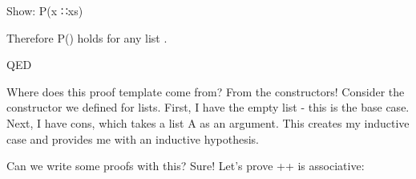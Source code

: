 \documentclass{lecturenotes}
\newcommand{\agdacons}{\textsf{∷}\xspace}
\begin{document}
\noindent Show: P(\textsf{x} \agdacons \textsf{xs}) 

\vspace{0.1in}

\noindent Therefore P() holds for any list .

\noindent QED

\vspace{0.2in}

Where does this proof template come from? From the constructors!
Consider the constructor we defined for lists. 
First, I have the empty list - this is the base case. 
Next, I have cons, which takes a list A as an argument. 
This creates my inductive case and provides me with an inductive hypothesis. 

\vspace{0.2in}

\noindent Can we write some proofs with this?
Sure! Let's prove \textsf{++} is associative:
\end{document}
